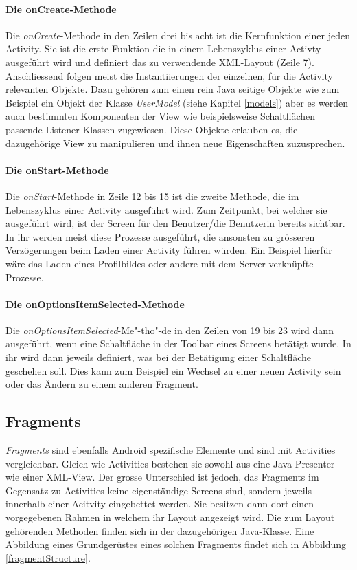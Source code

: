 \documentclass[../main.tex]{subfiles}
\begin{document}
	\paragraph{Die onCreate-Methode}
	Die \emph{onCreate}-Methode in den Zeilen drei bis acht ist die Kernfunktion einer jeden Activity. Sie ist die erste Funktion die in einem Lebenszyklus einer Activty ausgeführt wird und definiert das zu verwendende XML-Layout (Zeile 7). Anschliessend folgen meist die Instantiierungen der einzelnen, für die Activity relevanten Objekte. Dazu gehören zum einen rein Java seitige Objekte wie zum Beispiel ein Objekt der Klasse \emph{UserModel} (siehe Kapitel \ref{models}) aber es werden auch bestimmten Komponenten der View wie beispielsweise Schaltflächen passende Listener-Klassen zugewiesen. Diese Objekte erlauben es, die dazugehörige View zu manipulieren und ihnen neue Eigenschaften zuzusprechen.

	\paragraph{Die onStart-Methode}
	Die \emph{onStart}-Methode in Zeile 12 bis 15 ist die zweite Methode, die im Lebenszyklus einer Activity ausgeführt wird. Zum Zeitpunkt, bei welcher sie ausgeführt wird, ist der Screen für den Benutzer/die Benutzerin bereits sichtbar. In ihr werden meist diese Prozesse ausgeführt, die ansonsten zu grösseren Verzögerungen beim Laden einer Activity führen würden. Ein Beispiel hierfür wäre das Laden eines Profilbildes oder andere mit dem Server verknüpfte Prozesse.
	
	\paragraph{Die onOptionsItemSelected-Methode} 
	\sloppy
	Die \emph{onOptionsItemSelected}-Me"-tho"-de in den Zeilen von 19 bis 23 wird dann ausgeführt, wenn eine Schaltfläche in der Toolbar eines Screens betätigt wurde. In ihr wird dann jeweils definiert, was bei der Betätigung einer Schaltfläche geschehen soll. Dies kann zum Beispiel ein Wechsel zu einer neuen Activity sein oder das Ändern zu einem anderen Fragment.
	\fussy
	
	\subsection{Fragments}
	\emph{Fragments} sind ebenfalls Android spezifische Elemente und sind mit Activities vergleichbar. Gleich wie Activities bestehen sie sowohl aus eine Java-Presenter wie einer XML-View. Der grosse Unterschied ist jedoch, das Fragments im Gegensatz zu Activities keine eigenständige Screens sind, sondern jeweils innerhalb einer Acitvity eingebettet werden. Sie besitzen dann dort einen vorgegebenen Rahmen in welchem ihr Layout angezeigt wird. Die zum Layout gehörenden Methoden finden sich in der dazugehörigen Java-Klasse. Eine Abbildung eines Grundgerüstes eines solchen Fragments findet sich in Abbildung \ref{fragmentStructure}.
	
\end{document}
